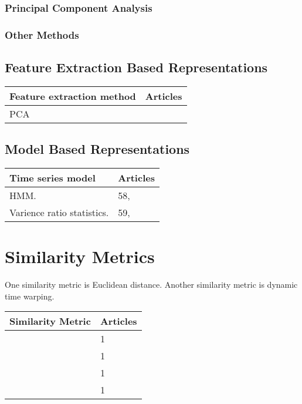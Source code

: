 \subsubsection*{Principal Component Analysis}

\subsubsection*{Other Methods}

\subsection{Feature Extraction Based Representations}

\begin{table*}[h]
    \centering
    \begin{tabular}{p{}p{}}
        \toprule
        Feature extraction method & Articles \\
        \midrule
        PCA    &  \\
        \bottomrule
    \end{tabular}
    \caption{}
    \label{tab:}
\end{table*}

\subsection{Model Based Representations}

\begin{table*}[h]
    \centering
    \begin{tabular}{p{}p{}}
        \toprule
        Time series model & Articles \\
        \midrule
        HMM. & 58, \\
        Varience ratio statistics. & 59, \\
        \bottomrule
    \end{tabular}
    \caption{}
    \label{tab:}
\end{table*}

\section{Similarity Metrics}
One similarity metric is Euclidean distance.
Another similarity metric is dynamic time warping.

\begin{table*}[h]
    \centering
    \begin{tabular}{p{}p{}}
        \toprule
        Similarity Metric & Articles \\
        \midrule
          & 1 \\
          & 1 \\
          & 1 \\
          & 1 \\
        \bottomrule
    \end{tabular}
    \caption{}
    \label{tab:}
\end{table*}

